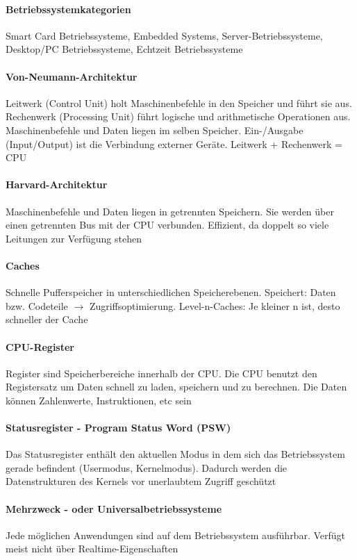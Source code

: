 \documentclass[11pt,a4paper,landscape]{article}
\begin{document}
\begin{multicols*}{3}
	\paragraph{Betriebssystemkategorien} Smart Card Betriebssysteme, Embedded Systems, Server-Betriebssysteme, Desktop/PC Betriebssysteme, Echtzeit Betriebssysteme
	\paragraph{Von-Neumann-Architektur} Leitwerk (Control Unit) holt Maschinenbefehle in den Speicher und führt sie aus. Rechenwerk (Processing Unit) führt logische und arithmetische Operationen aus. Maschinenbefehle und Daten liegen im selben Speicher. Ein-/Ausgabe (Input/Output) ist die Verbindung externer Geräte. Leitwerk + Rechenwerk = CPU
	
	\paragraph{Harvard-Architektur} Maschinenbefehle und Daten liegen in getrennten Speichern. Sie werden über einen getrennten Bus mit der CPU verbunden. Effizient, da doppelt so viele Leitungen zur Verfügung stehen
	\paragraph{Caches} Schnelle Pufferspeicher in unterschiedlichen Speicherebenen. Speichert: Daten bzw. Codeteile $\rightarrow$ Zugriffsoptimierung. Level-n-Caches: Je kleiner n ist, desto schneller der Cache
	\paragraph{CPU-Register} Register sind Speicherbereiche innerhalb der CPU. Die CPU benutzt den Registersatz um Daten schnell zu laden, speichern und zu berechnen. Die Daten können Zahlenwerte, Instruktionen, etc sein
	\paragraph{Statusregister - Program Status Word (PSW)} Das Statusregister enthält den aktuellen Modus in dem sich das Betriebssystem gerade befindent (Usermodus, Kernelmodus). Dadurch werden die Datenstrukturen des Kernels vor unerlaubtem Zugriff geschützt
	\paragraph{Mehrzweck - oder Universalbetriebssysteme} Jede möglichen Anwendungen sind auf dem Betriebssystem ausführbar. Verfügt meist nicht über Realtime-Eigenschaften

\end{multicols*}
\end{document}
